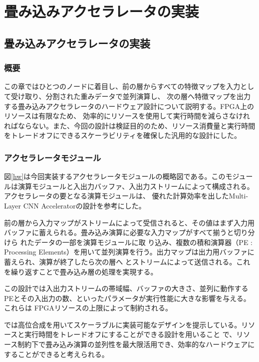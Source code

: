\chapter{畳み込みアクセラレータの実装}
\section{畳み込みアクセラレータの実装}
\subsection{概要}
この章ではひとつのノードに着目し、前の層からすべての特徴マップを入力として受け取り、分割された重みデータで並列演算し、
次の層へ特徴マップを出力する畳み込みアクセラレータのハードウェア設計について説明する。FPGA上のリソースは有限なため、
効率的にリソースを使用して実行時間を減らさなけれればならない。また、今回の設計は検証目的のため、リソース消費量と実行時間をトレードオフにできるスケーラビリティを確保した汎用的な設計にした。

\subsection{アクセラレータモジュール}
図\ref{hw}は今回実装するアクセラレータモジュールの概略図である。このモジュールは演算モジュールと入出力バッファ、入出力ストリームによって構成される。アクセラレータの要となる演算モジュールは、
優れた計算効率を出したMulti-Layer CNN Accelerator\cite{fpgaopt}の設計を参考にした。

前の層から入力マップがストリームによって受信されると、その値はまず入力用バッファに蓄えられる。畳み込み演算に必要な入力マップがすべて揃うと切り分けら
れたデータの一部を演算モジュールに取
り込み、複数の積和演算器（PE : Processing Elements）を用いて並列演算を行う。出力マップは出力用バッファに蓄えられ、演算が終了したら次の層へ
とストリームによって送信される。これを繰り返すことで畳み込み層の処理を実現する。

この設計では入出力ストリームの帯域幅、バッファの大きさ、並列に動作するPEとその入出力の数、といったパラメータが実行性能に大きな影響を与える。これらは
FPGAリソースの上限によって制約される。

\cite{fpgaopt}では高位合成を用いてスケーラブルに実装可能なデザインを提示している。リソースと実行時間をトレードオフにすることができる設計を用いること
で、リソース制約下で畳み込み演算の並列性を最大限活用でき、効率的なハードウェアにすることができると考えられる。

